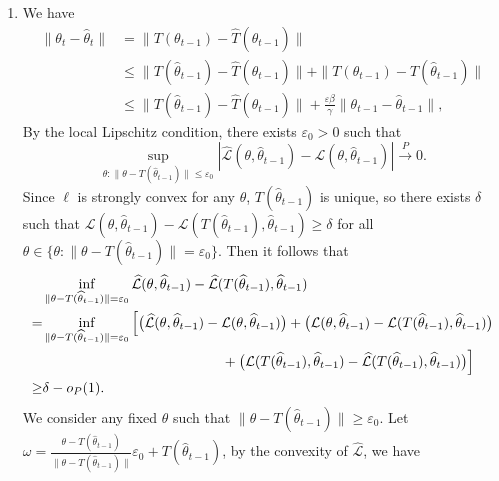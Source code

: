 \documentclass[../../../main.tex]{subfiles}
\begin{document}
\begin{msbproblem}
\begin{answerkey}
\begin{enumerate}
    \item We have
\[
\begin{aligned}
    \|\theta_t-\widehat\theta_t\|
    &=
    \|T(\theta_{t-1})-\widehat T(\widehat\theta_{t-1})\| \\
    &\le
    \|T(\widehat\theta_{t-1})-\widehat T(\widehat\theta_{t-1})\|
    +
    \|T(\theta_{t-1})-T(\widehat\theta_{t-1})\| \\
    &\le
    \|T(\widehat\theta_{t-1})-\widehat T(\widehat\theta_{t-1})\|
    +
    \frac{\varepsilon\beta}{\gamma}
    \|\theta_{t-1}-\widehat\theta_{t-1}\|,
\end{aligned}
\]
By the local Lipschitz condition, there exists $\varepsilon_0>0$ such that
\[
    \sup_{\theta:\|\theta-T(\widehat\theta_{t-1})\|\le\varepsilon_0}
    \left|
        \widehat{\mathcal{L}}(\theta,\widehat\theta_{t-1})
        -
        \mathcal{L}(\theta,\widehat\theta_{t-1})
    \right|
    \xrightarrow{P}0.
\]
Since $\ell$ is strongly convex for any $\theta$,
$T(\widehat\theta_{t-1})$ is unique, so there exists $\delta$
such that $\mathcal{L}(\theta,\widehat\theta_{t-1})-\mathcal{L}(T(\widehat\theta_{t-1}),\widehat\theta_{t-1}) \geq \delta$
for all
$\theta\in\{\theta:\|\theta-T(\widehat\theta_{t-1})\|=\varepsilon_0\}$.
Then it follows that
\[
\begin{aligned}
&\inf_{\|\theta-T(\widehat\theta_{t-1})\|=\varepsilon_0}
    \widehat{\mathcal{L}}(\theta,\widehat\theta_{t-1})
    -
    \widehat{\mathcal{L}}(T(\widehat\theta_{t-1}),\widehat\theta_{t-1}) \\
=&
\inf_{\|\theta-T(\widehat\theta_{t-1})\|=\varepsilon_0}
\Big[
    \bigl(
        \widehat{\mathcal{L}}(\theta,\widehat\theta_{t-1})
        -
        \mathcal{L}(\theta,\widehat\theta_{t-1})
    \bigr)
    +
    \bigl(
        \mathcal{L}(\theta,\widehat\theta_{t-1})
        -
        \mathcal{L}(T(\widehat\theta_{t-1}),\widehat\theta_{t-1})
    \bigr) \\
&\hspace{4.5cm}
    +
    \bigl(
        \mathcal{L}(T(\widehat\theta_{t-1}),\widehat\theta_{t-1})
        -
        \widehat{\mathcal{L}}(T(\widehat\theta_{t-1}),\widehat\theta_{t-1})
    \bigr)
\Big] \\
\ge& \delta-o_P(1).
\end{aligned}
\]
We consider any fixed $\theta$ such that
$\|\theta-T(\widehat\theta_{t-1})\|\ge\varepsilon_0$. Let $\omega=\frac{\theta-T(\widehat\theta_{t-1})}{\|\theta-T(\widehat\theta_{t-1})\|}\varepsilon_0+T(\widehat\theta_{t-1})$, by the convexity of $\widehat{\mathcal{L}}$, we have

\end{enumerate}
\end{answerkey}
\end{msbproblem}
\end{document}
